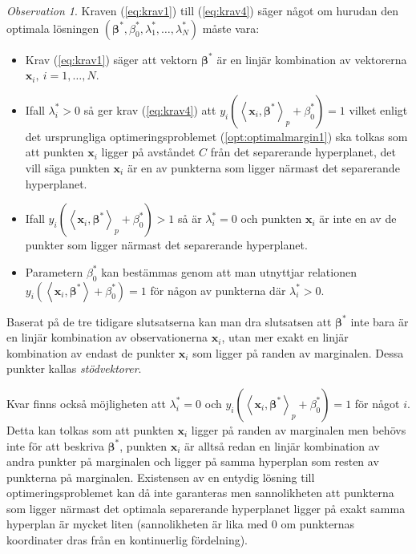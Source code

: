 \documentclass[a4paper, 12pt]{report}
\theoremstyle{definition}
\theoremstyle{remark}
\newtheorem*{rem}{Observation}
\newcommand{\bfbeta}{{\boldsymbol{\beta}}}
\newcommand{\bfx}{\mathbf{x}}
\newcommand{\llangle}{\left\langle}
\newcommand{\rrangle}{\right\rangle}
\newcommand{\inner}[2]{\llangle #1, #2 \rrangle}
\begin{document}
\begin{rem}
	Kraven (\ref{eq:krav1}) till (\ref{eq:krav4}) säger något om hurudan den optimala lösningen $\left(\bfbeta^*,\beta^*_0, \lambda_1^*,\dots,\lambda_N^*\right)$ måste vara:
	\begin{itemize}
		\item Krav (\ref{eq:krav1}) säger att vektorn $\bfbeta^*$ är en linjär kombination av vektorerna $\mathbf{x}_i,~i=1,\dots,N$.
		\item Ifall $\lambda^*_i > 0$ så ger krav (\ref{eq:krav4}) att $y_i\left(\inner{\bfx_i}{\bfbeta^*}_p+\beta^*_0\right) = 1$ vilket enligt det ursprungliga optimeringsproblemet (\ref{opt:optimalmargin1}) ska tolkas som att punkten $\mathbf{x}_i$ ligger på avståndet $C$ från det separerande hyperplanet, det vill säga punkten $\mathbf{x}_i$ är en av punkterna som ligger närmast det separerande hyperplanet.
		\item Ifall $y_i\left(\inner{\bfx_i}{\bfbeta^*}_p + \beta^*_0\right) > 1$ så är $\lambda^*_i = 0$ och punkten $\mathbf{x}_i$ är inte en av de punkter som ligger närmast det separerande hyperplanet.
		\item Parametern $\beta^*_0$ kan bestämmas genom att man utnyttjar relationen $y_i\left( \inner{\bfx_i}{\bfbeta^*} + \beta^*_0\right) = 1$ för någon av punkterna där $\lambda^*_i > 0$.
	\end{itemize}
	Baserat på de tre tidigare slutsatserna kan man dra slutsatsen att $\bfbeta^*$ inte bara är en linjär kombination av observationerna $\mathbf{x}_i$, utan mer exakt en linjär kombination av endast de punkter $\mathbf{x}_{i}$ som ligger på randen av marginalen. Dessa punkter kallas \emph{stödvektorer}.
\end{rem}

Kvar finns också möjligheten att $\lambda^*_i = 0$ och $y_i\left( \inner{\bfx_i}{\bfbeta^*}_p + \beta^*_0\right) = 1$ för något $i$.
Detta kan tolkas som att punkten $\bfx_i$ ligger på randen av marginalen men behövs inte för att beskriva $\bfbeta^*$, punkten $\bfx_i$ är alltså redan en linjär kombination av andra punkter på marginalen och ligger på samma hyperplan som resten av punkterna på marginalen.
Existensen av en entydig lösning till optimeringsproblemet kan då inte garanteras men sannolikheten att punkterna som ligger närmast det optimala separerande hyperplanet ligger på exakt samma hyperplan är mycket liten (sannolikheten är lika med 0 om punkternas koordinater dras från en kontinuerlig fördelning).
\end{document}
